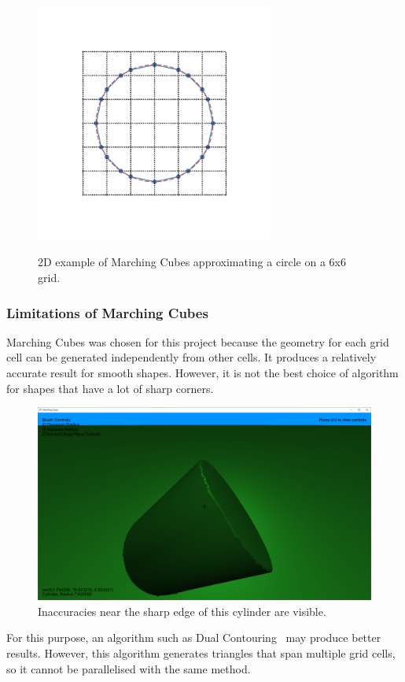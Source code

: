 \documentclass[11pt]{article}
\begin{document}
\begin{figure}[H]
  \caption{2D example of Marching Cubes approximating a circle on a 6x6 grid.}
  \includegraphics[width=0.7\textwidth]{ms_example.png}
  \label{fig:ms_example}
\end{figure}

\subsubsection{Limitations of Marching Cubes}
Marching Cubes was chosen for this project because the geometry for each grid cell can be generated independently from other cells. It produces a relatively accurate result for smooth shapes. However, it is not the best choice of algorithm for shapes that have a lot of sharp corners.
\begin{figure}[H]
  \includegraphics[width=\textwidth]{mc_cylinder.png}
  \caption{Inaccuracies near the sharp edge of this cylinder are visible.}
\end{figure}
For this purpose, an algorithm such as Dual Contouring~\cite{10.1145/566654.566586} may produce better results. However, this algorithm generates triangles that span multiple grid cells, so it cannot be parallelised with the same method.
\end{document}
